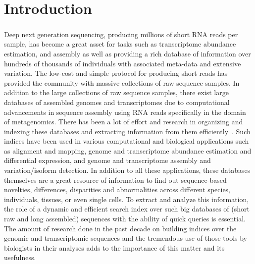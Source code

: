 
\chapter{Introduction}

\paragraph{}
Deep next generation sequencing, producing millions of short RNA reads per sample,
has become a great asset for tasks such as transcriptome abundance estimation, and
assembly as well as providing a rich database of information over hundreds of thousands of individuals
with associated meta-data and extensive variation. The low-cost and simple protocol for
producing short reads has provided the community with massive collections of raw sequence samples.
In addition to the large collections of raw sequence samples,
there exist large databases of assembled genomes and transcriptomes
due to computational advancements in sequence assembly
using RNA reads specifically in the domain of metagenomics.
There has been a lot of effort and research in organizing and indexing these databases
and extracting information from them efficiently~\cite{paten2017genome}.
Such indices have been used in various computational
and biological applications such as alignment and mapping,
genome and transcriptome abundance estimation and differential expression,
and genome and transcriptome assembly and variation/isoform detection.
In addition to all these applications, these databases themselves are a great resource
of information to find out sequence-based novelties, differences, disparities and abnormalities
across different species, individuals, tissues, or even single cells.
To extract and analyze this information, the role of a dynamic and efficient search index
over such big databases of (short raw and long assembled) sequences
with the ability of quick queries is essential.
The amount of research done in the past decade on building indices over
the genomic and transcriptomic sequences and the tremendous use of those tools by biologists
in their analyses adds to the importance of this matter and its usefulness.

